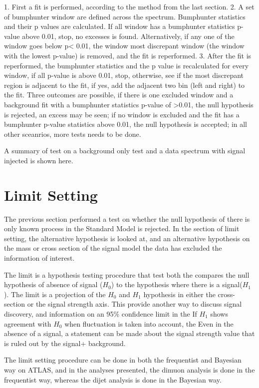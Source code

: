     1.  First a fit is performed, according to the method from the last section.
    2.  A set of bumphunter window are defined across the spectrum. Bumphunter statistics and their p values are calculated. 
    If all window has a bumphunter statistics p-value above 0.01, stop, no excesses is found. Alternatively, if any one of the window goes below p< 0.01, the window most discrepant window (the window with the lowest p-value) is removed, and the fit is reperformed.
    3. After the fit is reperformed, the bumphunter statistics and the p value is recalculated for every window, if all p-value is above 0.01, stop, otherwise, see if the most discrepant region is adjacent to the fit, if yes, add the adjacent two bin (left and right) to the fit. 
    Three outcomes are possible, if there is one excluded window and a background fit with a bumphunter statistics p-value of >0.01, the null hypothesis is rejected, an excess may be seen; if no window is excluded and the fit has a bumphunter p-value statistics above 0.01, the null hypothesis is accepted; in all other sceanrios, more tests needs to be done.

    A summary of test on a background only test and a data spectrum with signal injected is shown here.

    
\section{Limit Setting}

The previous section performed a test on whether the null hypothesis of there is only known process in the Standard Model is rejected. In the section of limit setting, the alternative hypothesis is looked at, and an alternative hypothesis on the mass or cross section of the signal model the data has excluded the information of interest. 

The limit is a hypothesis testing procedure that test both the 
compares the null hypothesis of absence of signal ($H_{0}$) to the hypothesis where there is a signal($H_{1}$). 
The limit is a projection of the $H_0$ and $H_1$ hypothesis in either the cross-section or the signal strength axis. This provide another way to discuss signal discovery, and information on an 95\% confidence limit in the If $H_1$ shows agreement with $H_{0}$ when fluctuation is taken into account, the 
Even in the absence of a signal, a statement can be made about the signal strength value that is ruled out by the signal+ background. 

The limit setting procedure can be done in both the frequentist and Bayesian way on ATLAS, and in the analyses presented, the dimuon analysis is done in the frequentist way, whereas the dijet analysis is done in the Bayesian way. 


